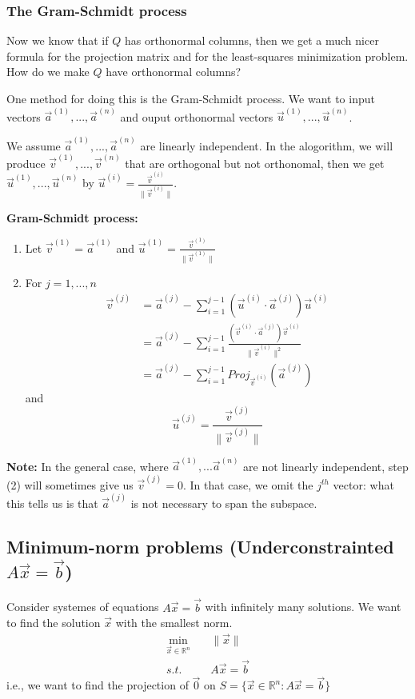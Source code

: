 \documentclass[11pt,a4paper]{article}
\begin{document}
\subsubsection{The Gram-Schmidt process}
Now we know that if $Q$ has orthonormal columns, then we get a much nicer formula for the projection matrix and for the least-squares minimization problem. How do we make $Q$ have orthonormal columns?

One method for doing this is the Gram-Schmidt process. We want to input vectors $\vec{a}^{(1)},...,\vec{a}^{(n)}$ and ouput orthonormal vectors $\vec{u}^{(1)},...,\vec{u}^{(n)}$.

We assume $\vec{a}^{(1)},...,\vec{a}^{(n)}$ are linearly independent. In the alogorithm, we will produce $\vec{v}^{(1)},...,\vec{v}^{(n)}$ that are orthogonal but not orthonomal, then we get $\vec{u}^{(1)},...,\vec{u}^{(n)}$ by $\vec{u}^{(i)}=\frac{\vec{v}^{(i)}}{\|\vec{v}^{(i)}\|}$.

\textbf{Gram-Schmidt process:}
\begin{enumerate}[(1)]
    \item Let $\vec{v}^{(1)}=\vec{a}^{(1)}$ and $\vec{u}^{(1)}=\frac{\vec{v}^{(1)}}{\|\vec{v}^{(1)}\|}$
    \item For $j=1,...,n$
    \begin{equation}
        \begin{aligned}
            \vec{v}^{(j)}&=\vec{a}^{(j)}-\sum_{i=1}^{j-1}(\vec{u}^{(i)}\cdot \vec{a}^{(j)})\vec{u}^{(i)}\\
            &=\vec{a}^{(j)}-\sum_{i=1}^{j-1}\frac{(\vec{v}^{(i)}\cdot \vec{a}^{(j)})\vec{v}^{(i)}}{\|\vec{v}^{(i)}\|^2}\\
            &=\vec{a}^{(j)}-\sum_{i=1}^{j-1}{Proj}_{\vec{v}^{(i)}}(\vec{a}^{(j)})
        \end{aligned}
        \nonumber
    \end{equation}
    and $$\vec{u}^{(j)}=\frac{\vec{v}^{(j)}}{\|\vec{v}^{(j)}\|}$$
\end{enumerate}
\textbf{Note:} In the general case, where $\vec{a}^{(1)},...\vec{a}^{(n)}$ are not linearly independent, step (2) will sometimes give us $\vec{v}^{(j)}=0$. In that case, we omit the $j^{th}$ vector: what this tells us is that $\vec{a}^{(j)}$ is not necessary to span the subspace.

\subsection{Minimum-norm problems (Underconstrainted $A \vec{x}= \vec{b}$)}
Consider systemes of equations $A \vec{x}=\vec{b}$ with infinitely many solutions. We want to find the solution $\vec{x}$ with the smallest norm.
\begin{equation}
    \begin{aligned}
        \min_{\vec{x}\in \mathbb{R}^n}\quad &\|\vec{x}\|\\
        s.t.\quad  & A \vec{x}=\vec{b}
    \end{aligned}
    \nonumber
\end{equation}
i.e., we want to find the projection of $\vec{0}$ on $S=\{\vec{x}\in \mathbb{R}^n: A \vec{x}=\vec{b}\}$
\end{document}
